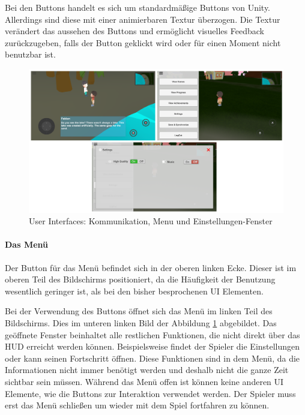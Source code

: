 					Bei den Buttons handelt es sich um standardmäßige Buttons von Unity. Allerdings sind diese mit einer animierbaren Textur überzogen. Die Textur verändert das aussehen des Buttons und ermöglicht visuelles Feedback zurückzugeben, falls der Button geklickt wird oder für einen Moment nicht benutzbar ist.

					\begin{figure}[htbp]
						\centering 
						\label{userInterfaces}
						\includegraphics[width=\textwidth]{pics/userInterface.png}
						\caption{User Interfaces: Kommunikation, Menu und Einstellungen-Fenster}
					\end{figure}

				\paragraph{Das Menü}
					Der Button für das Menü befindet sich in der oberen linken Ecke. Dieser ist im oberen Teil des Bildschirms positioniert, da die Häufigkeit der Benutzung wesentlich geringer ist, als bei den bisher besprochenen \ac{UI} Elementen.

					Bei der Verwendung des Buttons öffnet sich das Menü im linken Teil des Bildschirms. Dies im unteren linken Bild der Abbildung \ref{userInterfaces} abgebildet. Das geöffnete Fenster beinhaltet alle restlichen Funktionen, die nicht direkt über das \ac{HUD} erreicht werden können. Beispielsweise findet der Spieler die Einstellungen oder kann seinen Fortschritt öffnen. Diese Funktionen sind in dem Menü, da die Informationen nicht immer benötigt werden und deshalb nicht die ganze Zeit sichtbar sein müssen. Während das Menü offen ist können keine anderen \ac{UI} Elemente, wie die Buttons zur Interaktion verwendet werden. Der Spieler muss erst das Menü schließen um wieder mit dem Spiel fortfahren zu können. 

